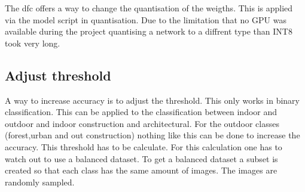The \acrshort{dfc} offers a way to change the quantisation of the weigths.
This is applied via the model script in quantisation.
Due to the limitation that no GPU was available during the project quantising a network to a diffrent type than INT8 took very long.


\subsection{Adjust threshold}

A way to increase accuracy is to adjust the threshold.
This only works in binary classification.
This can be applied to the classification between indoor and outdoor and indoor construction and architectural.
For the outdoor classes (forest,urban and out construction) nothing like this can be done to increase the accuracy.
This threshold has to be calculate.
For this calculation one has to watch out to use a balanced dataset.
To get a balanced dataset a subset is created so that each class has the same amount of images.
The images are randomly sampled.

